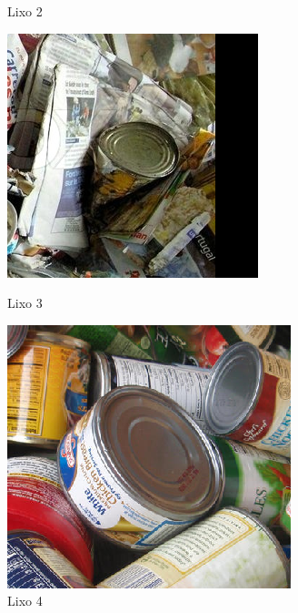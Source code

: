 \documentclass[conference, compsoc, 12pt]{IEEEtran}
\begin{document}
\begin{figure}[ht]
\begin{minipage}[b]{0.5\linewidth}
    \caption{Lixo 2}
    \vspace{4ex}
  \end{minipage}
  \begin{minipage}[b]{0.5\linewidth}
    \centering
    \includegraphics[width=.8\linewidth]{lixo3.png}
    \caption{Lixo 3}
    \vspace{4ex}
  \end{minipage}%
  \begin{minipage}[b]{0.5\linewidth}
    \centering
    \includegraphics[width=.8\linewidth]{lixo4.png}
    \caption{Lixo 4}
    \vspace{4ex}
  \end{minipage}
\end{figure}
\end{document}
